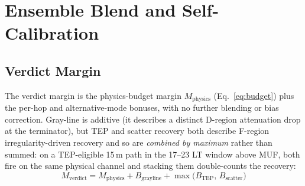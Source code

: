 \documentclass[11pt,a4paper]{article}
\begin{document}
\section{Ensemble Blend and Self-Calibration}\label{sec:ensemble}

\subsection{Verdict Margin}

The verdict margin is the physics-budget margin
$M_{\text{physics}}$ (Eq.~\ref{eq:budget}) plus the per-hop and
alternative-mode bonuses, with no further blending or bias
correction.  Gray-line is additive (it describes a distinct D-region
attenuation drop at the terminator), but TEP and scatter recovery
both describe F-region irregularity-driven recovery and so are
\emph{combined by maximum} rather than summed: on a TEP-eligible
15\,m path in the 17--23 LT window above MUF, both fire on the same
physical channel and stacking them double-counts the recovery:
\begin{equation}\label{eq:blend}
  M_{\text{verdict}} = M_{\text{physics}} + B_{\text{grayline}}
                     + \max\!\bigl(B_{\text{TEP}},\, B_{\text{scatter}}\bigr)
\end{equation}
\end{document}
